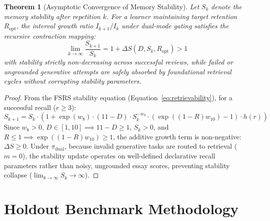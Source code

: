 \documentclass[11pt,a4paper]{article}
\newtheorem{theorem}{Theorem}
\begin{document}
\begin{theorem}[Asymptotic Convergence of Memory Stability]
\label{thm:stability}
Let $S_k$ denote the memory stability after repetition $k$. For a learner maintaining target retention $R_{\text{opt}}$, the interval growth ratio $I_{k+1}/I_k$ under dual-mode gating satisfies the recursive contraction mapping:
\begin{equation}
    \lim_{k \to \infty} \frac{S_{k+1}}{S_k} = 1 + \Delta S(D, S_k, R_{\text{opt}}) > 1
\end{equation}
with stability strictly non-decreasing across successful reviews, while failed or ungrounded generative attempts are safely absorbed by foundational retrieval cycles without corrupting stability parameters.
\end{theorem}
\begin{proof}
From the FSRS stability equation (Equation~\ref{eq:retrievability}), for a successful recall ($r \ge 3$):
\begin{equation}
    S_{k+1} = S_k \cdot \left( 1 + \exp(w_8) \cdot (11 - D) \cdot S_k^{-w_9} \cdot (\exp((1 - R)w_{10}) - 1) \cdot h(r) \right)
\end{equation}
Since $w_8 > 0$, $D \in [1, 10] \implies 11 - D \ge 1$, $S_k > 0$, and $R \le 1 \implies \exp((1-R)w_{10}) \ge 1$, the additive growth term is non-negative: $\Delta S \ge 0$. Under $\pi_{\text{dual}}$, because invalid generative tasks are routed to retrieval ($m=0$), the stability update operates on well-defined declarative recall parameters rather than noisy, ungrounded essay scores, preventing stability collapse ($\lim_{k \to \infty} S_k \to \infty$).
\end{proof}

\section{Holdout Benchmark Methodology}
\label{sec:methodology}
\end{document}
